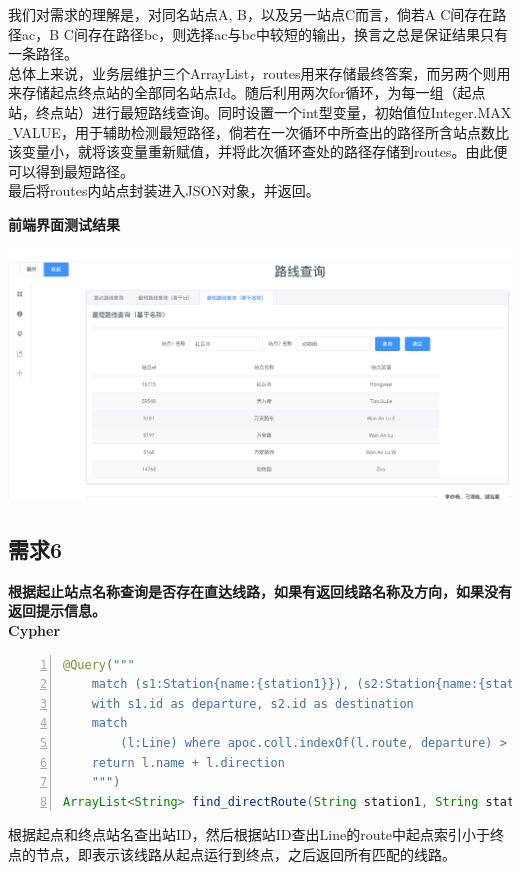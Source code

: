 \documentclass[11pt,a4paper]{article}
\begin{document}
我们对需求的理解是，对同名站点A, B，以及另一站点C而言，倘若A C间存在路径ac，B C间存在路径bc，则选择ac与bc中较短的输出，换言之总是保证结果只有一条路径。 \\
总体上来说，业务层维护三个ArrayList，routes用来存储最终答案，而另两个则用来存储起点终点站的全部同名站点Id。随后利用两次for循环，为每一组（起点站，终点站）进行最短路线查询。同时设置一个int型变量，初始值位Integer.MAX$\_$VALUE，用于辅助检测最短路径，倘若在一次循环中所查出的路径所含站点数比该变量小，就将该变量重新赋值，并将此次循环查处的路径存储到routes。由此便可以得到最短路径。 \\
最后将routes内站点封装进入JSON对象，并返回。

\textbf{前端界面测试结果} \\
\begin{center}
\centering
\includegraphics[scale=0.3]{./assets/demand5_2.png} 
\end{center}

\subsection{需求6}
\textbf{根据起止站点名称查询是否存在直达线路，如果有返回线路名称及方向，如果没有返回提示信息。} \\
\textbf{Cypher} \\
\begin{lstlisting}[numbers = left, 
showstringspaces=false,
showspaces = false,
breaklines = true, 
language=Java]
@Query("""
	match (s1:Station{name:{station1}}), (s2:Station{name:{station2}})
	with s1.id as departure, s2.id as destination
	match
		(l:Line) where apoc.coll.indexOf(l.route, departure) > 0 and apoc.coll.indexOf(l.route, departure) < apoc.coll.indexOf(l.route, destination)
	return l.name + l.direction
	""")
ArrayList<String> find_directRoute(String station1, String station2);
\end{lstlisting} 
根据起点和终点站名查出站ID，然后根据站ID查出Line的route中起点索引小于终点的节点，即表示该线路从起点运行到终点，之后返回所有匹配的线路。
\end{document}
